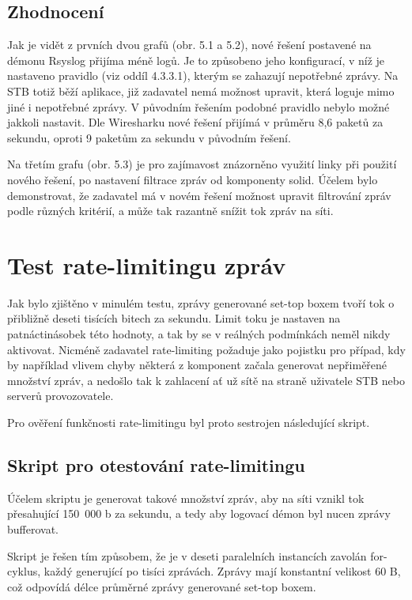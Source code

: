\documentclass[thesis=B,czech]{FITthesis}[2012/06/26]
\begin{document}
\subsection*{Zhodnocení}
Jak je vidět z prvních dvou grafů (obr. 5.1 a 5.2), nové řešení postavené na démonu Rsyslog přijíma méně logů. Je to způsobeno jeho konfigurací, v níž je nastaveno pravidlo (viz oddíl 4.3.3.1), kterým se zahazují nepotřebné zprávy. Na STB totiž běží aplikace, již zadavatel nemá možnost upravit, která loguje mimo jiné i nepotřebné zprávy. V původním řešením podobné pravidlo nebylo možné jakkoli nastavit.
Dle Wiresharku nové řešení přijímá v průměru 8,6 paketů za sekundu, oproti 9 paketům za sekundu v původním řešení.

Na třetím grafu (obr. 5.3) je pro zajímavost znázorněno využití linky při použití nového řešení, po nastavení filtrace zpráv od komponenty solid.
Účelem bylo demonstrovat, že zadavatel má v novém řešení možnost upravit filtrování zpráv podle různých kritérií, a může tak razantně snížit tok zpráv na síti.

\section{Test rate-limitingu zpráv}
Jak bylo zjištěno v minulém testu, zprávy generované set-top boxem tvoří tok o přibližně deseti tisících bitech za sekundu. Limit toku je nastaven na patnáctinásobek této hodnoty, a tak by se v reálných podmínkách neměl nikdy aktivovat. Nicméně zadavatel rate-limiting požaduje jako pojistku pro případ, kdy by například vlivem chyby některá z komponent začala generovat nepřiměřené množství zpráv, a nedošlo tak k zahlacení ať už sítě na straně uživatele STB nebo serverů provozovatele.

Pro ověření funkčnosti rate-limitingu byl proto sestrojen následující skript.

\subsection{Skript pro otestování rate-limitingu}
Účelem skriptu je generovat takové množství zpráv, aby na síti vznikl tok přesahující 150~000 b za sekundu, a tedy aby logovací démon byl nucen zprávy bufferovat.

Skript je řešen tím způsobem, že je v deseti paralelních instancích zavolán for-cyklus, každý generující po tisíci zprávách.
Zprávy mají konstantní velikost 60 B, což odpovídá délce průměrné zprávy generované set-top boxem.
\end{document}
